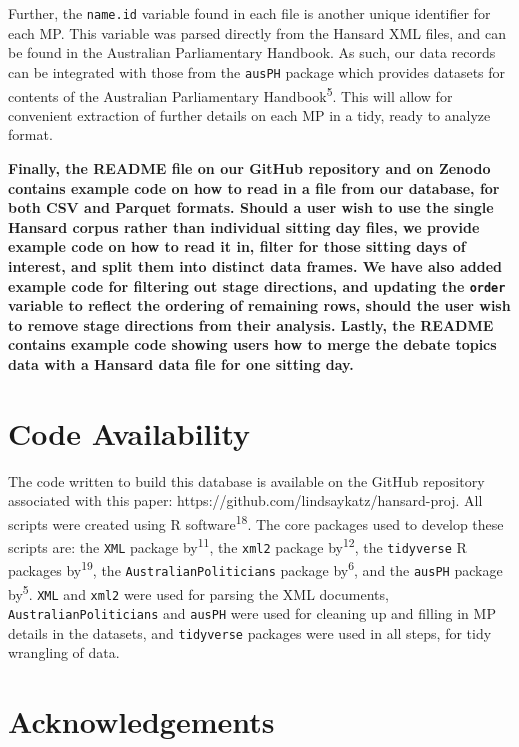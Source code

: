 \documentclass[
  letterpaper,
  DIV=11,
  numbers=noendperiod]{scrartcl}
\begin{document}
Further, the \texttt{name.id} variable found in each file is another
unique identifier for each MP. This variable was parsed directly from
the Hansard XML files, and can be found in the Australian Parliamentary
Handbook. As such, our data records can be integrated with those from
the \texttt{ausPH} package which provides datasets for contents of the
Australian Parliamentary Handbook\textsuperscript{5}. This will allow
for convenient extraction of further details on each MP in a tidy, ready
to analyze format.

\textbf{Finally, the README file on our GitHub repository and on Zenodo
contains example code on how to read in a file from our database, for
both CSV and Parquet formats. Should a user wish to use the single
Hansard corpus rather than individual sitting day files, we provide
example code on how to read it in, filter for those sitting days of
interest, and split them into distinct data frames. We have also added
example code for filtering out stage directions, and updating the
\texttt{order} variable to reflect the ordering of remaining rows,
should the user wish to remove stage directions from their analysis.
Lastly, the README contains example code showing users how to merge the
debate topics data with a Hansard data file for one sitting day.}

\hypertarget{code-availability}{%
\section{Code Availability}\label{code-availability}}

The code written to build this database is available on the GitHub
repository associated with this paper:
https://github.com/lindsaykatz/hansard-proj. All scripts were created
using R software\textsuperscript{18}. The core packages used to develop
these scripts are: the \texttt{XML} package by\textsuperscript{11}, the
\texttt{xml2} package by\textsuperscript{12}, the \texttt{tidyverse} R
packages by\textsuperscript{19}, the \texttt{AustralianPoliticians}
package by\textsuperscript{6}, and the \texttt{ausPH} package
by\textsuperscript{5}. \texttt{XML} and \texttt{xml2} were used for
parsing the XML documents, \texttt{AustralianPoliticians} and
\texttt{ausPH} were used for cleaning up and filling in MP details in
the datasets, and \texttt{tidyverse} packages were used in all steps,
for tidy wrangling of data.

\hypertarget{acknowledgements}{%
\section{Acknowledgements}\label{acknowledgements}}
\end{document}
